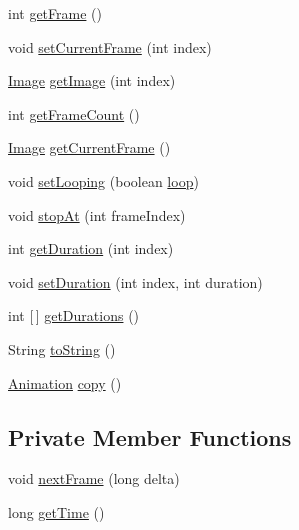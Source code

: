 \begin{DoxyCompactItemize}
int \mbox{\hyperlink{classorg_1_1newdawn_1_1slick_1_1_animation_ae4a4f4a202ca6e87a99856b31d0e2139}{get\+Frame}} ()
\item 
void \mbox{\hyperlink{classorg_1_1newdawn_1_1slick_1_1_animation_ae4fd05c73f24e269631b57bdffd93d45}{set\+Current\+Frame}} (int index)
\item 
\mbox{\hyperlink{classorg_1_1newdawn_1_1slick_1_1_image}{Image}} \mbox{\hyperlink{classorg_1_1newdawn_1_1slick_1_1_animation_af3f5a3449169fd7735525ceb54edd78c}{get\+Image}} (int index)
\item 
int \mbox{\hyperlink{classorg_1_1newdawn_1_1slick_1_1_animation_a5f639b2ad6f39b7a99949bc48e54c827}{get\+Frame\+Count}} ()
\item 
\mbox{\hyperlink{classorg_1_1newdawn_1_1slick_1_1_image}{Image}} \mbox{\hyperlink{classorg_1_1newdawn_1_1slick_1_1_animation_aa385a5aa37169acd0d2d014ffdd3314f}{get\+Current\+Frame}} ()
\item 
void \mbox{\hyperlink{classorg_1_1newdawn_1_1slick_1_1_animation_a5392a763b0076c488193d9b285069828}{set\+Looping}} (boolean \mbox{\hyperlink{classorg_1_1newdawn_1_1slick_1_1_animation_a44dd0ed98069bf4295965b8449362054}{loop}})
\item 
void \mbox{\hyperlink{classorg_1_1newdawn_1_1slick_1_1_animation_abc0b6beace9a12adfb11a6493afb3d4f}{stop\+At}} (int frame\+Index)
\item 
int \mbox{\hyperlink{classorg_1_1newdawn_1_1slick_1_1_animation_a5e51e58072497b8180288c240fc7a763}{get\+Duration}} (int index)
\item 
void \mbox{\hyperlink{classorg_1_1newdawn_1_1slick_1_1_animation_a4874b5b993d67d24e7635b084cc9ccbc}{set\+Duration}} (int index, int duration)
\item 
int \mbox{[}$\,$\mbox{]} \mbox{\hyperlink{classorg_1_1newdawn_1_1slick_1_1_animation_a38bee3c1d6b9eca8d3306ac3fedd9ceb}{get\+Durations}} ()
\item 
String \mbox{\hyperlink{classorg_1_1newdawn_1_1slick_1_1_animation_a6a471c56f65c091dac6b21772d640872}{to\+String}} ()
\item 
\mbox{\hyperlink{classorg_1_1newdawn_1_1slick_1_1_animation}{Animation}} \mbox{\hyperlink{classorg_1_1newdawn_1_1slick_1_1_animation_a1b958cdfbd5bc6477fc4c721e152314a}{copy}} ()
\end{DoxyCompactItemize}
\subsection*{Private Member Functions}
\begin{DoxyCompactItemize}
\item 
void \mbox{\hyperlink{classorg_1_1newdawn_1_1slick_1_1_animation_ae23662cd09dfe23e566c45b9bf85d97a}{next\+Frame}} (long delta)
\item 
long \mbox{\hyperlink{classorg_1_1newdawn_1_1slick_1_1_animation_ad5d5822b4aa1ac0ed36fdb06d8c3a9c5}{get\+Time}} ()
\end{DoxyCompactItemize}

